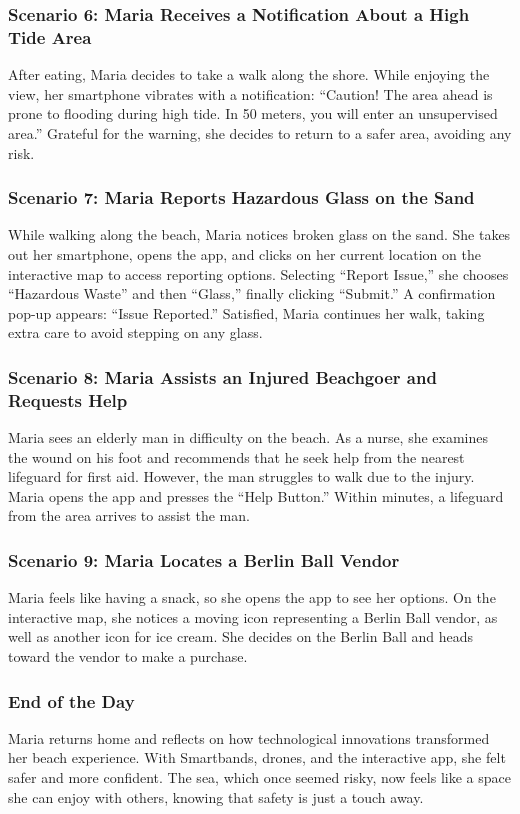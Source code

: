 \subsubsection{\textbf{Scenario 6:} Maria Receives a Notification About a High Tide Area}
After eating, Maria decides to take a walk along the shore. While enjoying the view, her smartphone vibrates with a notification: “Caution! The area ahead is prone to flooding during high tide. In 50 meters, you will enter an unsupervised area.” Grateful for the warning, she decides to return to a safer area, avoiding any risk.

\subsubsection{\textbf{Scenario 7:} Maria Reports Hazardous Glass on the Sand}
While walking along the beach, Maria notices broken glass on the sand. She takes out her smartphone, opens the app, and clicks on her current location on the interactive map to access reporting options. Selecting “Report Issue,” she chooses “Hazardous Waste” and then “Glass,” finally clicking “Submit.” A confirmation pop-up appears: “Issue Reported.” Satisfied, Maria continues her walk, taking extra care to avoid stepping on any glass.

\subsubsection{\textbf{Scenario 8:} Maria Assists an Injured Beachgoer and Requests Help}
Maria sees an elderly man in difficulty on the beach. As a nurse, she examines the wound on his foot and recommends that he seek help from the nearest lifeguard for first aid. However, the man struggles to walk due to the injury. Maria opens the app and presses the “Help Button.” Within minutes, a lifeguard from the area arrives to assist the man.

\subsubsection{\textbf{Scenario 9:} Maria Locates a Berlin Ball Vendor}
Maria feels like having a snack, so she opens the app to see her options. On the interactive map, she notices a moving icon representing a Berlin Ball vendor, as well as another icon for ice cream. She decides on the Berlin Ball and heads toward the vendor to make a purchase.

\subsubsection{\textbf{End of the Day}}
Maria returns home and reflects on how technological innovations transformed her beach experience. With Smartbands, drones, and the interactive app, she felt safer and more confident. The sea, which once seemed risky, now feels like a space she can enjoy with others, knowing that safety is just a touch away.

